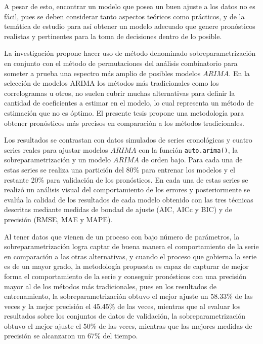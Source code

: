 \documentclass[
]{article}
\begin{document}
A pesar de esto, encontrar un modelo que posea un buen ajuste a los
datos no es fácil, pues se deben considerar tanto aspectos teóricos como
prácticos, y de la temática de estudio para así obtener un modelo
adecuado que genere pronósticos realistas y pertinentes para la toma de
decisiones dentro de lo posible.

La investigación propone hacer uso de método denominado
sobreparametrización en conjunto con el método de permutaciones del
análisis combinatorio para someter a prueba una espectro más amplio de
posibles modelos \(ARIMA\). En la selección de modelos ARIMA los métodos
más tradicionales como los correlogramas u otros, no suelen cubrir
muchas alternativas para definir la cantidad de coeficientes a estimar
en el modelo, lo cual representa un método de estimación que no es
óptimo. El presente tesis propone una metodología para obtener
pronósticos más precisos en comparación a los métodos tradicionales.

Los resultados se contrastan con datos simulados de series cronológicas
y cuatro series reales para ajustar modelos \(ARIMA\) con la función
\texttt{auto.arima()}, la sobreparametrización y un modelo \(ARIMA\) de
orden bajo. Para cada una de estas series se realiza una partición del
80\% para entrenar los modelos y el restante 20\% para validación de los
pronósticos. En cada una de estas series se realizó un análisis visual
del comportamiento de los errores y posteriormente se evalúa la calidad
de los resultados de cada modelo obtenido con las tres técnicas
descritas mediante medidas de bondad de ajuste (AIC, AICc y BIC) y de
precisión (RMSE, MAE y MAPE).

Al tener datos que vienen de un proceso con bajo número de parámetros,
la sobreparametrización logra captar de buena manera el comportamiento
de la serie en comparación a las otras alternativas, y cuando el proceso
que gobierna la serie es de un mayor grado, la metodología propuesta es
capaz de capturar de mejor forma el comportamiento de la serie y
conseguir pronósticos con una precisión mayor al de los métodos más
tradicionales, pues en los resultados de entrenamiento, la
sobreparametrización obtuvo el mejor ajuste un 58.33\% de las veces y la
mejor precisión el 45.45\% de las veces, mientras que al evaluar los
resultados sobre los conjuntos de datos de validación, la
sobreparametrización obtuvo el mejor ajuste el 50\% de las veces,
mientras que las mejores medidas de precisión se alcanzaron un 67\% del
tiempo.

\cleardoublepage
\end{document}
